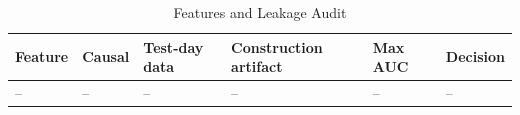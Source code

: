 \begin{table}[t]
\centering
\scriptsize
\caption{Features and Leakage Audit}
\label{tab:audit}
\begin{tabular}{llllll}
\toprule
Feature & Causal & Test-day data & Construction artifact & Max AUC & Decision \\
\midrule
-- & -- & -- & -- & -- & -- \\
\bottomrule
\end{tabular}
\end{table}
